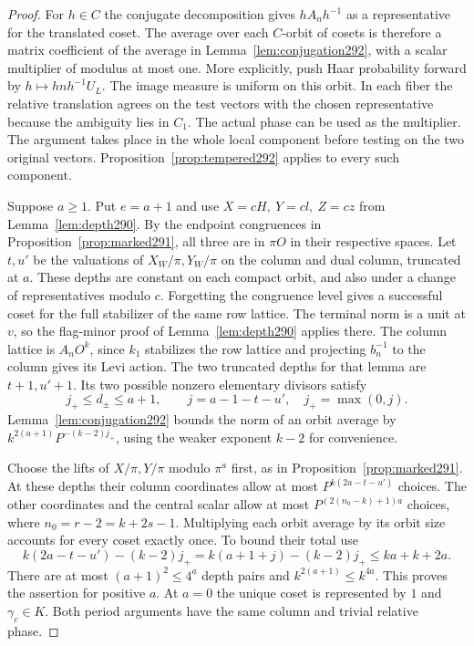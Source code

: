 \documentclass[a4paper,11pt]{article}
\theoremstyle{definition}
\theoremstyle{remark}
\numberwithin{equation}{section}
\begin{document}
\begin{proof}
For \(h\in C\) the conjugate decomposition gives \(hA_nh^{-1}\)
as a representative for the translated coset. The average
over each \(C\)-orbit of cosets is therefore a matrix
coefficient of the average in Lemma~\ref{lem:conjugation292},
with a scalar multiplier of modulus at most one. More
explicitly, push Haar probability forward by
\(h\mapsto hnh^{-1}U_L\). The image measure is uniform
on this orbit. In each fiber the relative translation
agrees on the test vectors with the chosen representative
because the ambiguity lies in \(C_1\). The actual phase
can be used as the multiplier. The argument takes place
in the whole local component before testing on the two
original vectors. Proposition~\ref{prop:tempered292}
applies to every such component.

Suppose \(a\ge1\). Put \(e=a+1\) and use \(X=cH,\ Y=cl,\
Z=cz\) from Lemma~\ref{lem:depth290}. By the endpoint
congruences in Proposition~\ref{prop:marked291}, all three
are in \(\pi O\) in their respective spaces. Let
\(t,u'\) be the valuations of \(X_W/\pi,Y_W/\pi\)
on the column and dual column, truncated at \(a\).
These depths are constant on each compact orbit, and
also under a change of representatives modulo \(c\).
Forgetting the congruence level gives a successful coset
for the full stabilizer of the same row lattice. The
terminal norm is a unit at \(v\), so the flag-minor proof
of Lemma~\ref{lem:depth290} applies there. The column
lattice is \(A_n O^k\), since \(k_1\) stabilizes the row
lattice and projecting \(b_n^{-1}\) to the column gives
its Levi action. The two truncated depths for that lemma
are \(t+1,u'+1\). Its two possible nonzero elementary
divisors satisfy
\[
 j_+\le d_\pm\le a+1,\qquad
 j=a-1-t-u',\quad j_+=\max(0,j).
\]
Lemma~\ref{lem:conjugation292} bounds the norm of an
orbit average by \(k^{2(a+1)}P^{-(k-2)j_+}\), using
the weaker exponent \(k-2\) for convenience.

Choose the lifts of \(X/\pi,Y/\pi\) modulo \(\pi^a\)
first, as in Proposition~\ref{prop:marked291}. At these
depths their column coordinates allow at most
\(P^{k(2a-t-u')}\) choices. The other coordinates and
the central scalar allow at most \(P^{(2(n_0-k)+1)a}\)
choices, where \(n_0=r-2=k+2s-1\). Multiplying each
orbit average by its orbit size accounts for every
coset exactly once. To bound their total use
\[
 k(2a-t-u')-(k-2)j_+
       =k(a+1+j)-(k-2)j_+ \le ka+k+2a .
\]
There are at most \((a+1)^2\le4^a\) depth pairs and
\(k^{2(a+1)}\le k^{4a}\). This proves the assertion for
positive \(a\). At \(a=0\) the unique coset is represented
by \(1\) and \(\gamma_c\in K\). Both period arguments have
the same column and trivial relative phase.
\end{proof}
\end{document}
